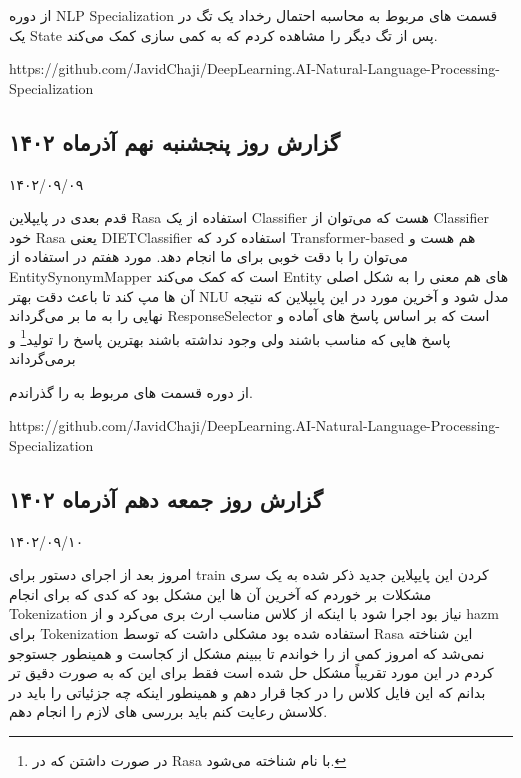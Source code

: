 از دوره NLP Specialization قسمت های مربوط به محاسبه احتمال رخداد یک تگ در یک State پس از تگ دیگر را مشاهده کردم که به کمی سازی  کمک می‌کند.

https://github.com/JavidChaji/DeepLearning.AI-Natural-Language-Processing-Specialization

\subsection{گزارش روز پنجشنبه نهم آذرماه ۱۴۰۲}

۱۴۰۲/۰۹/۰۹

قدم بعدی در پایپلاین Rasa استفاده از یک Classifier هست که می‌توان از Classifier خود Rasa یعنی DIETClassifier استفاده کرد که Transformer-based هم هست و می‌توان  را با دقت خوبی برای ما انجام دهد.
مورد هفتم در  استفاده از EntitySynonymMapper است که کمک می‌کند Entity های هم معنی را به شکل اصلی آن ها مپ کند تا باعث دقت بهتر NLU مدل شود
و آخرین مورد در این پایپلاین که نتیجه نهایی را به ما بر می‌گرداند ResponseSelector است که بر اساس پاسخ های آماده و پاسخ هایی که مناسب باشند ولی وجود نداشته باشند بهترین پاسخ را تولید\footnote{در صورت داشتن  که در Rasa با نام  شناخته می‌شود.} و برمی‌گرداند

از دوره  قسمت های مربوط به  را گذراندم.

https://github.com/JavidChaji/DeepLearning.AI-Natural-Language-Processing-Specialization



\subsection{گزارش روز جمعه دهم آذرماه ۱۴۰۲}

۱۴۰۲/۰۹/۱۰

امروز بعد از اجرای دستور  برای train کردن این پایپلاین جدید ذکر شده به یک سری مشکلات بر خوردم که آخرین آن ها این مشکل بود که کدی که برای انجام Tokenization نیاز بود اجرا شود با اینکه از کلاس مناسب ارث بری می‌کرد و از hazm برای Tokenization استفاده شده بود مشکلی داشت که توسط Rasa این  شناخته نمی‌شد که امروز کمی از  را خواندم تا ببینم مشکل از کجاست و همینطور جستوجو کردم در این مورد تقریباً مشکل حل شده است فقط برای این که به صورت دقیق تر بدانم که این فایل کلاس  را در کجا قرار دهم و همینطور اینکه چه جزئیاتی را باید در کلاسش رعایت کنم باید بررسی های لازم را انجام دهم.

